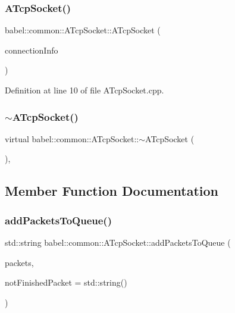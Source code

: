 \subsubsection{\texorpdfstring{A\+Tcp\+Socket()}{ATcpSocket()}}
{\footnotesize\ttfamily babel\+::common\+::\+A\+Tcp\+Socket\+::\+A\+Tcp\+Socket (\begin{DoxyParamCaption}\item[{\mbox{\hyperlink{classbabel_1_1common_1_1_connection_info}{Connection\+Info}} \&}]{connection\+Info }\end{DoxyParamCaption})\hspace{0.3cm}{\ttfamily [explicit]}}



Definition at line 10 of file A\+Tcp\+Socket.\+cpp.

\mbox{\label{classbabel_1_1common_1_1_a_tcp_socket_a1030e55170e3c533442588a71370eb0a}} 
\subsubsection{\texorpdfstring{$\sim$\+A\+Tcp\+Socket()}{~ATcpSocket()}}
{\footnotesize\ttfamily virtual babel\+::common\+::\+A\+Tcp\+Socket\+::$\sim$\+A\+Tcp\+Socket (\begin{DoxyParamCaption}{ }\end{DoxyParamCaption})\hspace{0.3cm}{\ttfamily [virtual]}, {\ttfamily [default]}}



\subsection{Member Function Documentation}
\mbox{\label{classbabel_1_1common_1_1_a_tcp_socket_ad92a444e56b590684b28978319a26b0f}} 
\subsubsection{\texorpdfstring{add\+Packets\+To\+Queue()}{addPacketsToQueue()}}
{\footnotesize\ttfamily std\+::string babel\+::common\+::\+A\+Tcp\+Socket\+::add\+Packets\+To\+Queue (\begin{DoxyParamCaption}\item[{std\+::string \&}]{packets,  }\item[{std\+::string}]{not\+Finished\+Packet = {\ttfamily std\+:\+:string()} }\end{DoxyParamCaption})\hspace{0.3cm}{\ttfamily [protected]}}



